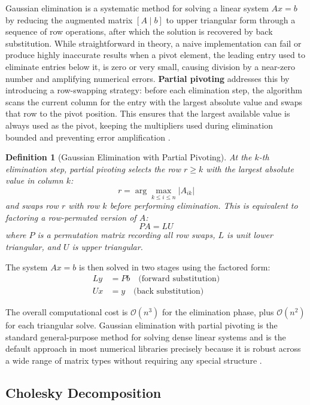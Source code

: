 \documentclass[12pt,a4paper]{report}
\newtheorem{definition}{Definition}[chapter]
\begin{document}
Gaussian elimination is a systematic method for solving a linear system \( Ax = b \) by reducing the augmented matrix \( [A \mid b] \) to upper triangular form through a sequence of row operations, after which the solution is recovered by back substitution. While straightforward in theory, a naive implementation can fail or produce highly inaccurate results when a pivot element, the leading entry used to eliminate entries below it, is zero or very small, causing division by a near-zero number and amplifying numerical errors. \textbf{Partial pivoting} addresses this by introducing a row-swapping strategy: before each elimination step, the algorithm scans the current column for the entry with the largest absolute value and swaps that row to the pivot position. This ensures that the largest available value is always used as the pivot, keeping the multipliers used during elimination bounded and preventing error amplification \parencite{anton2014elementary}.

\begin{definition}[Gaussian Elimination with Partial Pivoting]
    At the \( k \)-th elimination step, partial pivoting selects the row 
    \( r \geq k \) with the largest absolute value in column \( k \):
    \[
        r = \arg\max_{k \leq i \leq n} |A_{ik}|
    \]
    and swaps row \( r \) with row \( k \) before performing elimination. This 
    is equivalent to factoring a row-permuted version of \( A \):
    \[
        PA = LU
    \]
    where \( P \) is a permutation matrix recording all row swaps, \( L \) is unit lower triangular, and \( U \) is upper triangular.
\end{definition}

The system \( Ax = b \) is then solved in two stages using the factored form:
\begin{align*}
    Ly &= Pb \quad \text{(forward substitution)} \\
    Ux &= y  \quad \text{(back substitution)}
\end{align*}

The overall computational cost is \( \mathcal{O}(n^3) \) for the elimination phase, plus \( \mathcal{O}(n^2) \) for each triangular solve. Gaussian elimination with partial pivoting is the standard general-purpose method for solving dense linear systems and is the default approach in most numerical libraries precisely because it is robust across a wide range of matrix types without requiring any special structure \parencite{anton2014elementary}.

\subsection{Cholesky Decomposition}
\end{document}
